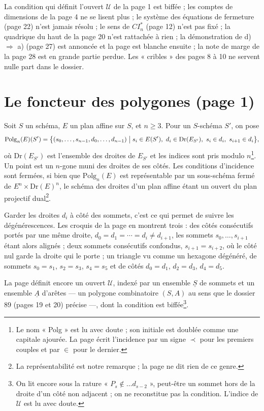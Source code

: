 \documentclass[11pt,a4paper]{article}
\begin{document}
La condition qui définit l'ouvert $\mathcal{U}$ de la page 1 est biffée ; les
comptes de dimensions de la page 4 ne se lisent plus ; le système des équations
de fermeture (page 22) n'est jamais résolu ; le sens de $CI_n^*$ (page 12)
n'est pas fixé ; la quadrique du haut de la page 20 n'est rattachée à rien ;
la démonstration de d) $\Rightarrow$ a) (page 27) est annoncée et la page est
blanche ensuite ; la note de marge de la page 28 est en grande partie perdue.
Les « cribles » des pages 8 à 10 ne servent nulle part dans le dossier.

\section*{Le foncteur des polygones (page 1)}

Soit $S$ un schéma, $E$ un plan affine sur $S$, et $n \geqslant 3$. Pour un
$S$-schéma $S'$, on pose
\[
  \mathrm{Polg}_n(E)(S') = \bigl\{ (s_0, \ldots, s_{n-1}, d_0, \ldots,
  d_{n-1}) \bigm| s_i \in E(S'),\ d_i \in \mathrm{Dr}(E_{S'}),\
  s_i \in d_i,\ s_{i+1} \in d_i \bigr\},
\]
où $\mathrm{Dr}(E_{S'})$ est l'ensemble des droites de $E_{S'}$ et les indices
sont pris modulo $n$\footnote{Le nom « Polg » est lu avec doute ; son
initiale est doublée comme une capitale ajourée. La page écrit l'incidence par
un signe $\prec$ pour les premiers couples et par $\in$ pour le dernier.}. Un
point est un $n$-gone muni des droites de ses côtés. Les conditions d'incidence
sont fermées, si bien que $\mathrm{Polg}_n(E)$ est représentable par un
sous-schéma fermé de $E^n \times \mathrm{Dr}(E)^n$, le schéma des droites d'un
plan affine étant un ouvert du plan projectif dual\footnote{La représentabilité
est notre remarque ; la page ne dit rien de ce genre.}.

Garder les droites $d_i$ à côté des sommets, c'est ce qui permet de suivre les
dégénérescences. Les croquis de la page en montrent trois : des côtés
consécutifs portés par une même droite, $d_0 = d_1 = \cdots = d_i \neq d_{i+1}$,
les sommets $s_0, \ldots, s_{i+1}$ étant alors alignés ; deux sommets
consécutifs confondus, $s_{i+1} = s_{i+2}$, où le côté nul garde la droite qui
le porte ; un triangle vu comme un hexagone dégénéré, de sommets
$s_0 = s_1$, $s_2 = s_3$, $s_4 = s_5$ et de côtés $d_0 = d_1$, $d_2 = d_3$,
$d_4 = d_5$.

La page définit encore un ouvert $\mathcal{U}$, indexé par un ensemble
$\underline{S}$ de sommets et un ensemble $\underline{A}$ d'arêtes --- un
polygone combinatoire $(S, A)$ au sens que le dossier 89 (pages 19 et 20)
précise ---, dont la condition est biffée\footnote{On lit encore sous la
rature « $P_s \notin \ldots d_{s-2}$ », peut-être un sommet hors de la droite
d'un côté non adjacent ; on ne reconstitue pas la condition. L'indice de
$\mathcal{U}$ est lu avec doute.}.
\end{document}
